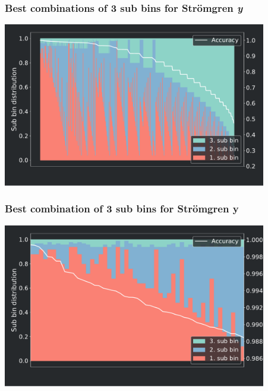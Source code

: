 {
	\frametitle{Best combinations of 3 sub bins for Str\"omgren \textit{y}}
	\centering
	\includegraphics[width=115mm]{images/optimal_stroemgren_0}
}
\frame
{
	\frametitle{Best combination of 3 sub bins for Str\"omgren y}
	\centering
	\includegraphics[width=115mm]{images/optimal_stroemgren_1}
}

